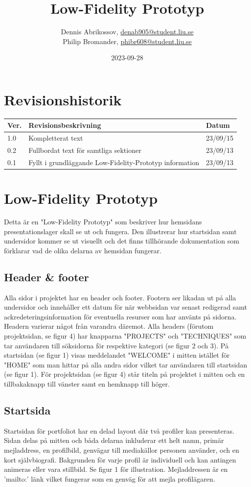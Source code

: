 \documentclass{liu_mall}
\author{Dennis Abrikossov, \url{denab905@student.liu.se}\\
  Philip Bromander, \url{phibr608@student.liu.se}}
\title{Low-Fidelity Prototyp}
\date{2023-09-28}
\begin{document}
\projectpage
\section{Revisionshistorik}
\begin{table}[!h]
\begin{tabularx}{\linewidth}{|l|X|l|}
\hline
Ver. & Revisionsbeskrivning & Datum \\\hline
1.0 & Kompletterat text & 23/09/15\\\hline
0.2 & Fullbordat text för samtliga sektioner & 23/09/13\\\hline
0.1 & Fyllt i grundläggande Low-Fidelity-Prototyp information & 23/09/13 \\\hline
\end{tabularx}
\end{table}

\newpage
\section{Low-Fidelity Prototyp}
    Detta är en "Low-Fidelity Prototyp" som beskriver hur hemsidans presentationslager skall se ut och fungera. Den illustrerar hur startsidan samt undersidor kommer se ut visuellt och det finns tillhörande dokumentation som förklarar vad de olika delarna av hemsidan fungerar.

\subsection{Header \& footer}
    Alla sidor i projektet har en header och footer. Footern ser likadan ut på alla undersidor och innehåller ett datum för när webbsidan var senast redigerad samt ackredeteringsinformation för eventuella resurser som har använts på sidorna. Headern varierar något från varandra däremot. Alla headers (förutom projektsidan, se figur 4) har knapparna "PROJECTS" och "TECHNIQUES" som tar användaren till söksidorna för respektive kategori (se figur 2 och 3). På startsidan (se figur 1) visas meddelandet "WELCOME" i mitten istället för "HOME" som man hittar på alla andra sidor vilket tar användaren till startsidan (se figur 1). För projektsidan (se figur 4) står titeln på projektet i mitten och en tillbakaknapp till vänster samt en hemknapp till höger.

\newpage
\subsection{Startsida}
    Startsidan för portfoliot har en delad layout där två profiler kan presenteras. Sidan delas på mitten och båda delarna inkluderar ett helt namn, primär mejladdress, en profilbild, genvägar till mediakällor personen använder, och en kort självbiografi. Bakgrunden för varje profil är individuell och kan antingen animeras eller vara stillbild. Se figur 1 för illustration. Mejladdressen är en 'mailto:' länk vilket fungerar som en genväg för att mejla profilägaren.
\end{document}
